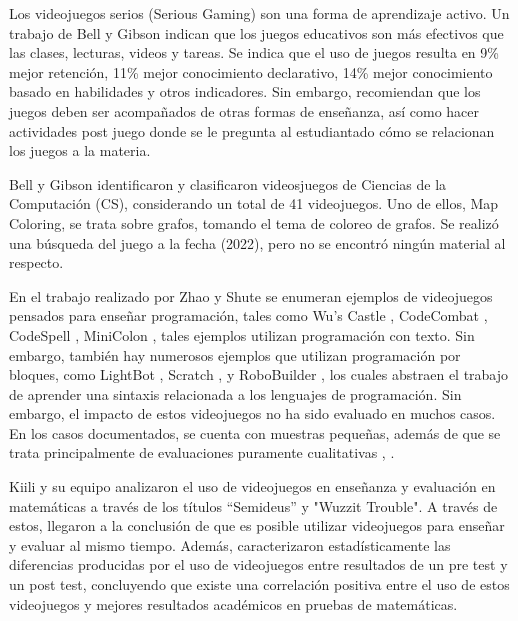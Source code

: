 \documentclass[submission]{eptcs}
\begin{document}
Los videojuegos serios (Serious Gaming) son una forma de aprendizaje activo. Un trabajo de Bell y Gibson \cite{evaluation_of_games_for_teaching_cs} indican que los juegos
educativos son más efectivos que las clases, lecturas, videos y tareas. Se indica que el uso de juegos resulta en 9\% mejor retención, 11\% mejor conocimiento declarativo,
14\% mejor conocimiento basado en habilidades y otros indicadores. Sin embargo, recomiendan que los juegos deben ser acompañados
de otras formas de enseñanza, así como hacer actividades post juego donde se le pregunta al estudiantado cómo se relacionan los juegos a la materia.

Bell y Gibson \cite{evaluation_of_games_for_teaching_cs} identificaron y clasificaron videosjuegos de Ciencias de la Computación (CS),
considerando un total de 41 videojuegos. Uno de ellos, Map Coloring, se trata sobre grafos, tomando el tema de coloreo de grafos.
Se realizó una búsqueda del juego a la fecha (2022), pero no se encontró ningún material al respecto.

En el trabajo realizado por Zhao y Shute \cite{video_game_foster_computational_thinking} se enumeran ejemplos de videojuegos pensados para enseñar programación,
tales como Wu's Castle \cite{wuscastle}, CodeCombat \cite{CodeCombat}, CodeSpell \cite{codespells}, MiniColon \cite{minicolon},
tales ejemplos utilizan programación con texto. Sin embargo, también hay numerosos ejemplos que utilizan programación por
bloques, como LightBot \cite{LightBot}, Scratch \cite{maloney2010scratch}, \cite{scratch} y RoboBuilder \cite{RoboBuilder}, los
cuales abstraen el trabajo de aprender una sintaxis relacionada a los lenguajes de programación.
Sin embargo, el impacto de estos videojuegos no ha sido evaluado en muchos casos. En los casos documentados, se cuenta con
muestras pequeñas, además de que se trata principalmente de evaluaciones puramente cualitativas \cite{video_game_foster_computational_thinking},
\cite{effectiveness_gbl}.

Kiili y su equipo \cite{using_videogames_maths} analizaron el uso de videojuegos en enseñanza
y evaluación en matemáticas a través de los títulos ``Semideus'' y "Wuzzit Trouble". A través
de estos, llegaron a la conclusión de que es posible utilizar videojuegos para enseñar y
evaluar al mismo tiempo. Además, caracterizaron estadísticamente las diferencias producidas por el uso
de videojuegos entre resultados de un pre test y un post test, concluyendo que existe una correlación positiva
entre el uso de estos videojuegos y mejores resultados académicos en pruebas de matemáticas.
\end{document}
